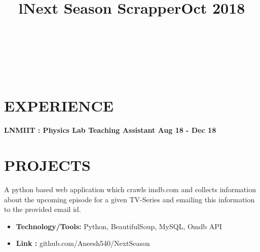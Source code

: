 \documentclass[margin]{res}
\begin{document}
\begin{resume}
\begin{format}
\title{l}\\
\\
\body\\
\end{format}

\section{EXPERIENCE}

\textbf{LNMIIT : Physics Lab Teaching Assistant \hfill{Aug 18 - Dec 18}\\}

\section{PROJECTS}
\location{}
\title{\textbf{Next Season Scrapper\hfill Oct 2018}
 }
\begin{position}
A python based web application which crawls imdb.com and collects information about the upcoming episode for a given TV-Series and emailing this information to the provided email id.
\begin{itemize}
\item \textbf{Technology/Tools:} Python, BeautifulSoup, MySQL, Omdb API
\end{itemize}
\begin{itemize}
\item \textbf{Link :} github.com/Aneesh540/NextSeason
\end{itemize}
\end{position}


\end{resume}
\end{document}
